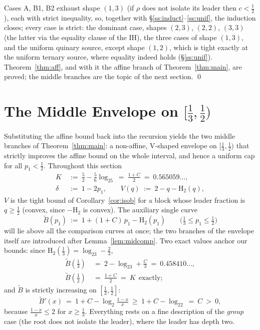 \documentclass[journal]{IEEEtran}
\theoremstyle{definition}
\newcommand{\Hh}{\mathrm H_2}
\newcommand{\lgg}{\log_2}
\newcommand{\CC}{C}
\begin{document}
\medskip
Cases A, B1, B2 exhaust shape $(1,3)$ (if $\rho$ does not isolate its leader
then $c<\tfrac12$), each with strict inequality, so, together with
\S\ref{ss:induct}--\ref{ss:unif}, the induction closes; every case is strict:
the dominant case, shapes $(2,3)$, $(2,2)$, $(3,3)$ (the latter via the
equality clause of the IH), the three cases of shape $(1,3)$, and the uniform
quinary source, except shape $(1,2)$, which is tight exactly at the
uniform ternary source, where equality indeed holds (\S\ref{ss:unif}).
Theorem~\ref{thm:aff}, and with it the affine branch of
Theorem~\ref{thm:main}, are proved; the middle branches are the topic of
the next section. \qed

\section{The Middle Envelope on $[\tfrac13,\tfrac12)$}\label{sec:midcap}

Substituting the affine bound back into the recursion yields the two middle
branches of Theorem~\ref{thm:main}: a non-affine, V-shaped envelope on $[\tfrac13,\tfrac12)$ that strictly improves the affine
bound on the whole interval, and hence a uniform cap for all $p_1<\tfrac12$.
Throughout this section
\[
\begin{aligned}
  K\ &:=\ \tfrac52-\tfrac56\lgg5\ =\ \tfrac{1+\CC}{2}\ =\ 0.565059\ldots,\\
  \delta\ &:=\ 1-2p_1,\qquad V(q)\ :=\ 2-q-\Hh(q),
\end{aligned}
\]
$V$ is the tight bound of
Corollary~\ref{cor:isob} for a block whose leader fraction is $q\ge\tfrac12$
(convex, since $-\Hh$ is convex). The auxiliary single curve
\[
  \tilde B(p_1)\ :=\ 1+(1+\CC)\,p_1-\Hh(p_1)
  \qquad\bigl(\tfrac13\le p_1\le\tfrac12\bigr)
\]
will lie above all the comparison curves at once; the two branches of the
envelope itself are introduced after Lemma~\ref{lem:midcomp}.
Two exact values anchor our bounds: since $\Hh(\tfrac13)=\lgg3-\tfrac23$,
\[
\begin{aligned}
  \tilde B(\tfrac13)\ &=\ 2-\lgg3+\tfrac{\CC}{3}\ =\ 0.458410\ldots,\\
  \tilde B(\tfrac12)\ &=\ \tfrac{1+\CC}{2}\ =\ K\ \ \text{exactly};
\end{aligned}
\]
and $\tilde B$ is strictly increasing on $[\tfrac13,\tfrac12]$:
\begin{equation}\label{eq:btmono}
  \tilde B'(x)\ =\ 1+\CC-\lgg\tfrac{1-x}{x}\ \ge\ 1+\CC-\lgg2\ =\ \CC\ >\ 0,
\end{equation}
because $\tfrac{1-x}{x}\le2$ for $x\ge\tfrac13$. Everything rests on a fine
description of the \emph{group} case (the root does not isolate the leader),
where the leader has depth two.
\end{document}
